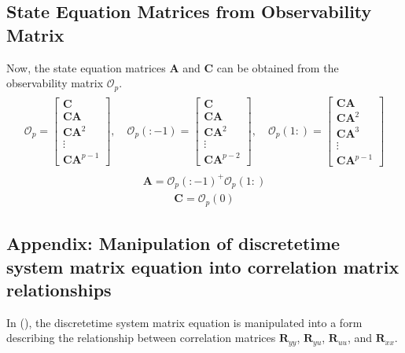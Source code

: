 \documentclass[letterpaper,10pt,english]{sphinxmanual}
\begin{document}
\subsection{State Equation Matrices from Observability Matrix}
\label{\detokenize{theory/srim:state-equation-matrices-from-observability-matrix}}
\sphinxAtStartPar
Now, the state equation matrices \(\bm{A}\) and
\(\bm{C}\) can be obtained from the observability matrix
\(\mathcal{O}_p\).
\begin{equation*}
\begin{split}\begin{aligned}
\mathcal{O}_{p}
=
\begin{bmatrix}
\bm{C} \\
\bm{CA} \\
\bm{CA}^{2} \\
\vdots \\
\bm{CA}^{p-1}
\end{bmatrix}
, \quad{}
\mathcal{O}_{p}(:-1)
=
\begin{bmatrix}
\bm{C} \\
\bm{CA} \\
\bm{CA}^{2} \\
\vdots \\
\bm{CA}^{p-2}
\end{bmatrix}
, \quad{}
\mathcal{O}_{p}(1:)
=
\begin{bmatrix}
\bm{CA} \\
\bm{CA}^{2} \\
\bm{CA}^{3} \\
\vdots \\
\bm{CA}^{p-1}
\end{bmatrix}
\end{aligned}\end{split}
\end{equation*}\begin{equation*}
\begin{split}\bm{A} = \mathcal{O}_{p}(:-1)^{+}\mathcal{O}_{p}(1:)\end{split}
\end{equation*}\begin{equation*}
\begin{split}\bm{C} = \mathcal{O}_{p}(0)\end{split}
\end{equation*}

\subsection{Appendix: Manipulation of discrete\sphinxhyphen{}time system matrix equation into correlation matrix relationships}
\label{\detokenize{theory/srim:appendix-manipulation-of-discrete-time-system-matrix-equation-into-correlation-matrix-relationships}}
\sphinxAtStartPar
In (), the discrete\sphinxhyphen{}time
system matrix equation is manipulated into a form describing the
relationship between correlation matrices \(\bm{R}_{yy}\),
\(\bm{R}_{yu}\), \(\bm{R}_{uu}\), and
\(\bm{R}_{xx}\).
\end{document}
